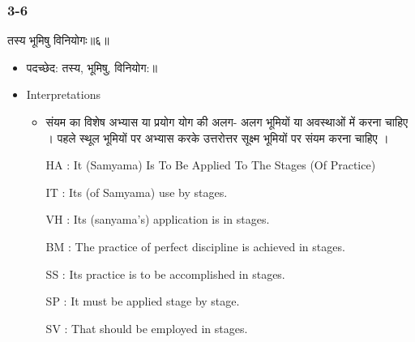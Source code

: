 \begin{frame}[fragile]\frametitle{3-6}
\begin{sanskrit}
तस्य भूमिषु विनियोगः॥६॥
\end{sanskrit}

	\begin{itemize}
	\item पदच्छेद: तस्य, भूमिषु, विनियोग:॥
	\item Interpretations
		\begin{itemize}	
		\item संयम का विशेष अभ्यास या प्रयोग योग की अलग- अलग भूमियों या अवस्थाओं में करना चाहिए । पहले स्थूल भूमियों पर अभ्यास करके उत्तरोत्तर सूक्ष्म भूमियों पर संयम करना चाहिए ।
		\item [HA]: It (Samyama) Is To Be Applied To The Stages (Of Practice)
		\item [IT]: Its (of Samyama) use by stages.
		\item [VH]: Its (sanyama’s) application is in stages.
		\item [BM]: The practice of perfect discipline is achieved in stages.
		\item [SS]: Its practice is to be accomplished in stages.
		\item [SP]: It must be applied stage by stage.
		\item [SV]: That should be employed in stages. 
		\end{itemize}
	\end{itemize}
\end{frame}


